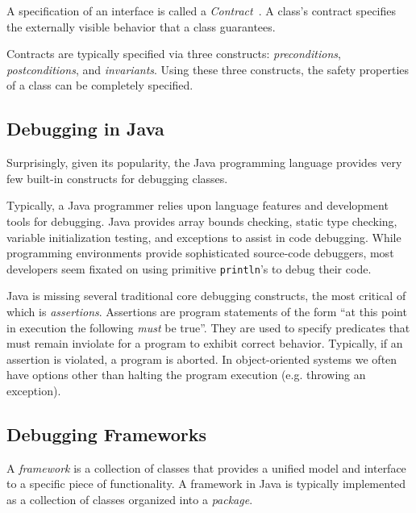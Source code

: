 \documentclass{article}
\begin{document}
A specification of an interface is called a
\emph{Contract}~\cite{HamiltonPowellMitchell93,HelmHollandGangopadhyay90,Holland92,Meyer88}.
A class's contract specifies the externally visible behavior that a
class guarantees.

Contracts are typically specified via three constructs:
\emph{preconditions}, \emph{postconditions}, and
\emph{invariants}.  Using these three constructs, the safety
properties of a class can be completely specified.

\subsection{Debugging in Java}

Surprisingly, given its popularity, the Java programming language
provides very few built-in constructs for debugging classes.

Typically, a Java programmer relies upon language features and
development tools for debugging.  Java provides array bounds checking,
static type checking, variable initialization testing, and exceptions
to assist in code debugging.  While programming environments provide
sophisticated source-code debuggers, most developers seem fixated on
using primitive \texttt{println}'s to debug their code.

Java is missing several traditional core debugging constructs, the
most critical of which is \emph{assertions}.  Assertions are program
statements of the form ``at this point in execution the following
\emph{must} be true''.  They are used to specify predicates that must
remain inviolate for a program to exhibit correct behavior.
Typically, if an assertion is violated, a program is aborted. In
object-oriented systems we often have options other than halting the
program execution (e.g. throwing an exception).

\subsection{Debugging Frameworks}

A \emph{framework} is a collection of classes that provides a unified
model and interface to a specific piece of functionality.  A framework
in Java is typically implemented as a collection of classes organized
into a \emph{package}.

\end{document}
